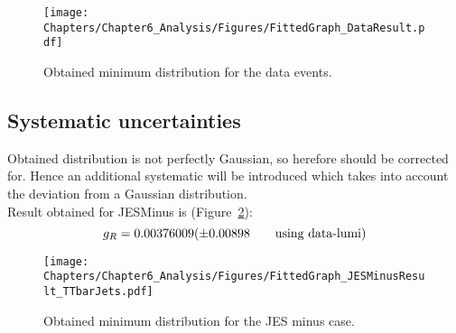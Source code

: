 \begin{figure}[h!t]
 \centering
 \texttt{[image: Chapters/Chapter6\_Analysis/Figures/FittedGraph\_DataResult.pdf]}
 \caption{Obtained minimum distribution for the data events.} \label{fig::MinData}
\end{figure}


\subsection{Systematic uncertainties}

Obtained distribution is not perfectly Gaussian, so herefore should be corrected for.
Hence an additional systematic will be introduced which takes into account the deviation from a Gaussian distribution.
\\

Result obtained for JESMinus is (Figure~\ref{fig::MinJESMinus}):
\begin{equation}
 g_{R} = 0.00376009 (\pm 0.00898 \qquad \textrm{using data-lumi})
\end{equation}

\begin{figure}[h!t]
 \centering
 \texttt{[image: Chapters/Chapter6\_Analysis/Figures/FittedGraph\_JESMinusResult\_TTbarJets.pdf]}
 \caption{Obtained minimum distribution for the JES minus case.} \label{fig::MinJESMinus}
\end{figure}

